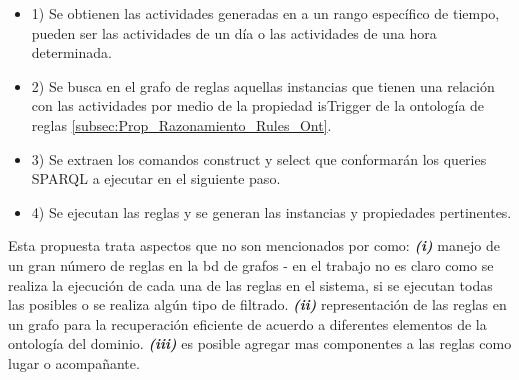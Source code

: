 \begin{itemize}
    \item 1) Se obtienen las actividades generadas en a un rango específico de tiempo, pueden ser las actividades de un día o las actividades de una hora determinada.
    \item 2) Se busca en el grafo de reglas aquellas instancias que tienen una relación con las actividades por medio de la propiedad isTrigger de la ontología de reglas \ref{subsec:Prop_Razonamiento_Rules_Ont}.
    \item 3) Se extraen los comandos construct y select que conformarán los queries SPARQL a ejecutar en el siguiente paso.
    \item 4) Se ejecutan las reglas y se generan las instancias y propiedades pertinentes.
\end{itemize}

Esta propuesta trata aspectos que no son mencionados por \cite{Meditskos2013} como:
\textbf{\textit{(i)}} manejo de un gran número de reglas en la bd de grafos - en el trabajo no es claro como se realiza la ejecución de cada una de las reglas en el sistema, si se ejecutan todas las posibles o se realiza algún tipo de filtrado.
\textbf{\textit{(ii)}} representación de las reglas en un grafo para la recuperación eficiente de acuerdo a diferentes elementos de la ontología del dominio.
\textbf{\textit{(iii)}} es posible agregar mas componentes a las reglas como lugar o acompañante.

